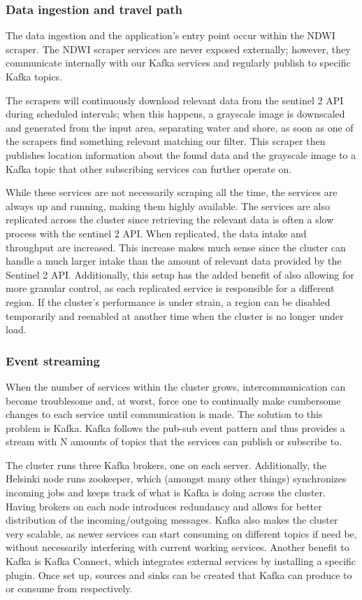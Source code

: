 \subsubsection{Data ingestion and travel path}

The data ingestion and the application's entry point occur within the NDWI scraper. The NDWI scraper services are never exposed externally; however, they communicate internally with our Kafka services and regularly publish to specific Kafka topics. 

The scrapers will continuously download relevant data from the sentinel 2 API during scheduled intervals; when this happens, a grayscale image is downscaled and generated from the input area, separating water and shore, as soon as one of the scrapers find something relevant matching our filter. This scraper then publishes location information about the found data and the grayscale image to a Kafka topic that other subscribing services can further operate on.

While these services are not necessarily scraping all the time, the services are always up and running, making them highly available. The services are also replicated across the cluster since retrieving the relevant data is often a slow process with the sentinel 2 API. When replicated, the data intake and throughput are increased. This increase makes much sense since the cluster can handle a much larger intake than the amount of relevant data provided by the Sentinel 2 API. Additionally, this setup has the added benefit of also allowing for more granular control, as each replicated service is responsible for a different region. If the cluster's performance is under strain, a region can be disabled temporarily and reenabled at another time when the cluster is no longer under load.

\subsubsection{Event streaming}

When the number of services within the cluster grows, intercommunication can become troublesome and, at worst, force one to continually make cumbersome changes to each service until communication is made. The solution to this problem is Kafka. Kafka follows the pub-sub event pattern and thus provides a stream with N amounts of topics that the services can publish or subscribe to.

The cluster runs three Kafka brokers, one on each server. Additionally, the Helsinki node runs zookeeper, which (amongst many other things) synchronizes incoming jobs and keeps track of what is Kafka is doing across the cluster. Having brokers on each node introduces redundancy and allows for better distribution of the incoming/outgoing messages. Kafka also makes the cluster very scalable, as newer services can start consuming on different topics if need be, without necessarily interfering with current working services. Another benefit to Kafka is Kafka Connect, which integrates external services by installing a specific plugin. Once set up, sources and sinks can be created that Kafka can produce to or consume from respectively.

